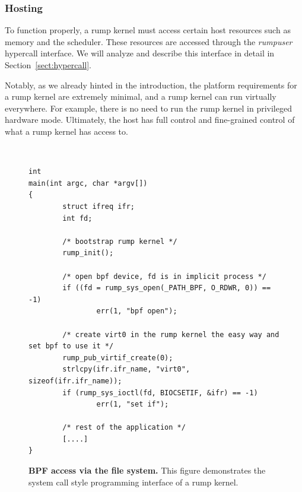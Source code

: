 \subsubsection{Hosting}

To function properly, a rump kernel must access certain host resources
such as memory and the scheduler.  These resources are accessed through
the \textit{rumpuser} hypercall interface.  We will analyze and describe
this interface in detail in Section~\ref{sect:hypercall}.

Notably, as we already hinted in the introduction, the platform
requirements for a rump kernel are extremely minimal, and a rump kernel
can run virtually everywhere.  For example, there is no need to run the
rump kernel in privileged hardware mode.  Ultimately, the host has full
control and fine-grained control of what a rump kernel has access to.


\begin{figure}
{\tt \scriptsize
\begin{verbatim}
int
main(int argc, char *argv[])
{
        struct ifreq ifr;
        int fd;

        /* bootstrap rump kernel */
        rump_init();

        /* open bpf device, fd is in implicit process */
        if ((fd = rump_sys_open(_PATH_BPF, O_RDWR, 0)) == -1)
                err(1, "bpf open");

        /* create virt0 in the rump kernel the easy way and set bpf to use it */
        rump_pub_virtif_create(0);
        strlcpy(ifr.ifr_name, "virt0", sizeof(ifr.ifr_name));
        if (rump_sys_ioctl(fd, BIOCSETIF, &ifr) == -1)
                err(1, "set if");

        /* rest of the application */
        [....]
}
\end{verbatim}}
\caption[BPF access via file system]{\textbf{BPF access via the file
system.} This figure demonstrates the system call style programming interface
of a rump kernel.}
\label{fig:bpfvfs}
\end{figure}

